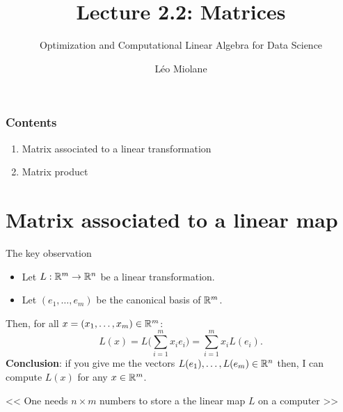 \documentclass{beamer}
\title{Lecture 2.2: Matrices}
\subtitle{Optimization and Computational Linear Algebra for Data Science}
\author{Léo Miolane}
\date{}
\begin{document}
\setcounter{showProgressBar}{0}
\setcounter{showSlideNumbers}{0}

\frame{\titlepage}

\begin{frame}
	\frametitle{Contents}
	\begin{enumerate}
		\item Matrix associated to a linear transformation
		\item Matrix product
	\end{enumerate}
\end{frame}


\setcounter{framenumber}{0}
\setcounter{showSlideNumbers}{1}
\section{Matrix associated to a linear map}
\begin{frame}[t]{The key observation}

	\begin{itemize}
		\item Let $L: \mathbb{R}^m \to \mathbb{R}^n$ be a linear transformation.
		\item Let $(e_1, \dots, e_m)$ be the canonical basis of $\mathbb{R}^m$.
	\end{itemize}
	\vspace{0.2cm}

Then, for all $x = (x_1, \dots, x_m) \in \mathbb{R}^m$:
$$
L(x) = 
L\Big( \sum_{i=1}^m x_i e_i \Big) = \sum_{i=1}^m x_i L(e_i).
$$
\pause
\textbf{Conclusion}: if you give me the vectors $L(e_1), \dots, L(e_m) \in \mathbb{R}^n$ then, I can compute $L(x)$ for any $x \in \mathbb{R}^m$.

\vspace{1cm}
\begin{center}
<< One needs $n \times m$ numbers to store a the linear map $L$ on a computer >>
\end{center}

\end{frame}
\end{document}
